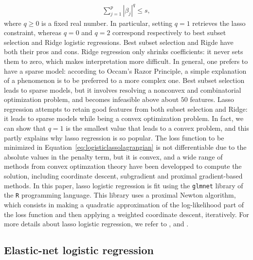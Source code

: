 \documentclass{article}
\begin{document}
\begin{align}
    \sum_{j = 1}^p |\beta_j|^q \le s,
\end{align}
where $q \ge 0$ is a fixed real number. In particular, setting $q = 1$ retrieves the lasso constraint, whereas $q = 0$ and $q = 2$ correspond respectively to best subset selection and Ridge logistic regressions. Best subset selection and Rigde have both their pros and cons. Ridge regression only shrinks coefficients: it never sets them to zero, which makes interpretation more difficult. In general, one prefers to have a sparse model: according to Occam's Razor Principle, a simple explanation of a phenomenon is to be preferred to a more complex one. Best subset selection leads to sparse models, but it involves resolving a nonconvex and combinatorial optimization problem, and becomes infeasible above about $50$ features. Lasso regression attempts to retain good features from both subset selection and Ridge: it leads to sparse models while being a convex optimization problem. In fact, we can show that $q = 1$ is the smallest value that leads to a convex problem, and this partly explains why lasso regression is so popular. The loss function to be minimized in Equation~\ref{eq:logisticlassolagrangian} is not differentiable due to the absolute values in the penalty term, but it is convex, and a wide range of methods from convex optimzation theory have been developped to compute the solution, including coordinate descent, subgradient and proximal gradient-based methods. In this paper, lasso logistic regression is fit using the \texttt{glmnet} library of the \texttt{R} programming language. This library uses a proximal Newton algorithm, which consists in making a quadratic approximation of the log-likelihood part of the loss function and then applying a weighted coordinate descent, iteratively. For more details about lasso logistic regression, we refer to \cite{friedman2010regularization}, \cite{hastie2015statistical} and \cite{hastie2016introduction}.

\subsection{Elastic-net logistic regression}
\end{document}

